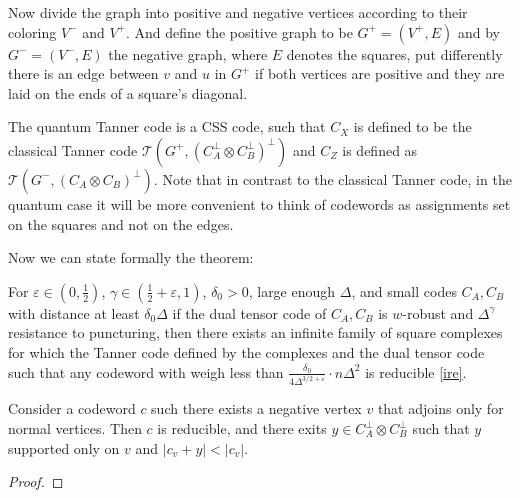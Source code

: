 \begin{definition}
Now divide the graph into positive and negative vertices according to their coloring $V^{-}$ and $V^{+}$. And define the positive graph to be $G^{+} = \left( V^{+}, E \right)$ and by $G^{-} = \left( V^{-}, E \right)$ the negative graph, where $E$ denotes the squares, put differently there is an edge between $v$ and $u$ in $G^{+}$ if both vertices are positive and they are laid on the ends of a square's diagonal.


The quantum Tanner code is a CSS code, such that $C_{X}$ is defined to be the classical Tanner code $\mathcal{T}\left(G^{+}, \left(C_{A}^\perp\otimes C_{B}^{\perp}\right)^{\perp} \right)$ and $C_{Z}$ is defined as $\mathcal{T}\left(G^{-}, \left(C_{A}\otimes C_{B}\right)^{\perp} \right)$. Note that in contrast to the classical Tanner code, in the quantum case it will be more convenient to think of codewords as assignments set on the squares and not on the edges.
\end{definition}

Now we can state formally the theorem: 

\begin{theorem}
  For $\varepsilon \in \left( 0,\frac{1}{2} \right)$, $\gamma\in \left( \frac{1}{2} + \varepsilon, 1 \right)$, $\delta_{0}> 0$, large enough $\Delta$, and small codes $C_{A},C_{B}$ with distance at least $\delta_{0}\Delta$ if the dual tensor code of $C_{A},C_{B}$ is $w$-robust and $\Delta^{\gamma}$ resistance to puncturing, then there exists an infinite family of square complexes for which the Tanner code defined by the complexes and the dual tensor code such that any codeword with weigh less than $ \frac{\delta_{0}}{4\Delta^{3/2 + \varepsilon}} \cdot n \Delta^{2} $ is reducible \cref{ire}.
\end{theorem}

\begin{claim}
  Consider a codeword $c$ such there exists a negative vertex $v$ that adjoins only for normal vertices. Then $c$ is reducible, and there exits $y \in C_{A}^{\perp}\otimes C_{B}^{\perp}$ such that $y$ supported only on $v$ and $ | c_{v} + y | < |c_{v}| $.       
\end{claim}

\begin{proof}
\end{proof}




